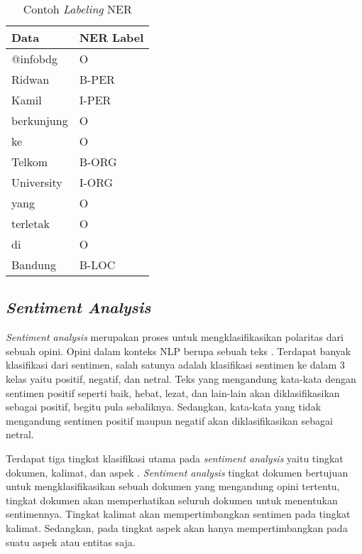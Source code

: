 \begin{table}[h]
    \vspace{0.25cm}
    \caption{Contoh \textit{Labeling} NER \parencite{ner}}
    \label{table:contoh-labeling-ner}
    \begin{center}
        \begin{tabular}{ll}
            \hline
            \textbf{Data} & \textbf{NER Label} \\ \hline
            @infobdg & O \\ \hline
            Ridwan & B-PER \\ \hline
            Kamil & I-PER \\ \hline
            berkunjung & O \\ \hline
            ke & O \\ \hline
            Telkom & B-ORG \\ \hline
            University & I-ORG \\ \hline
            yang & O \\ \hline
            terletak & O \\ \hline
            di & O \\ \hline
            Bandung & B-LOC \\ \hline
        \end{tabular}
    \end{center}
\end{table}

\subsection{\textit{Sentiment Analysis}}

\textit{Sentiment analysis} merupakan proses untuk mengklasifikasikan polaritas dari sebuah opini. Opini dalam konteks NLP berupa sebuah teks \parencite{sentiment_stock}. Terdapat banyak klasifikasi dari sentimen, salah satunya adalah klasifikasi sentimen ke dalam 3 kelas yaitu positif, negatif, dan netral. Teks yang mengandung kata-kata dengan sentimen positif seperti baik, hebat, lezat, dan lain-lain akan diklasifikasikan sebagai positif, begitu pula sebaliknya. Sedangkan, kata-kata yang tidak mengandung sentimen positif maupun negatif akan diklasifikasikan sebagai netral.

Terdapat tiga tingkat klasifikasi utama pada \textit{sentiment analysis} yaitu tingkat dokumen, kalimat, dan aspek \parencite{sentiment_algo}. \textit{Sentiment analysis} tingkat dokumen bertujuan untuk mengklasifikasikan sebuah dokumen yang mengandung opini tertentu, tingkat dokumen akan memperhatikan seluruh dokumen untuk menentukan sentimennya. Tingkat kalimat akan mempertimbangkan sentimen pada tingkat kalimat. Sedangkan, pada tingkat aspek akan hanya mempertimbangkan pada suatu aspek atau entitas saja.

